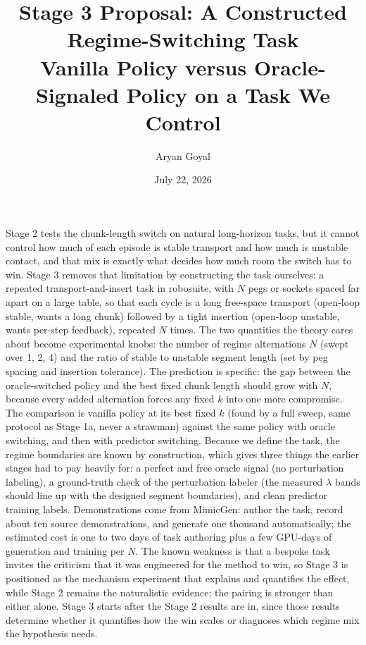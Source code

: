 \documentclass[11pt]{article}
\title{Stage 3 Proposal: A Constructed Regime-Switching Task\\
\large Vanilla Policy versus Oracle-Signaled Policy on a Task We Control}
\author{Aryan Goyal}
\date{July 22, 2026}
\begin{document}
\maketitle

\noindent
Stage 2 tests the chunk-length switch on natural long-horizon tasks, but it
cannot control how much of each episode is stable transport and how much is
unstable contact, and that mix is exactly what decides how much room the
switch has to win. Stage 3 removes that limitation by constructing the task
ourselves: a repeated transport-and-insert task in robosuite, with $N$ pegs
or sockets spaced far apart on a large table, so that each cycle is a long
free-space transport (open-loop stable, wants a long chunk) followed by a
tight insertion (open-loop unstable, wants per-step feedback), repeated $N$
times. The two quantities the theory cares about become experimental knobs:
the number of regime alternations $N$ (swept over 1, 2, 4) and the ratio of
stable to unstable segment length (set by peg spacing and insertion
tolerance). The prediction is specific: the gap between the oracle-switched
policy and the best fixed chunk length should grow with $N$, because every
added alternation forces any fixed $k$ into one more compromise. The
comparison is vanilla policy at its best fixed $k$ (found by a full sweep,
same protocol as Stage 1a, never a strawman) against the same policy with
oracle switching, and then with predictor switching. Because we define the
task, the regime boundaries are known by construction, which gives three
things the earlier stages had to pay heavily for: a perfect and free oracle
signal (no perturbation labeling), a ground-truth check of the perturbation
labeler (the measured $\lambda$ bands should line up with the designed
segment boundaries), and clean predictor training labels. Demonstrations
come from MimicGen: author the task, record about ten source demonstrations,
and generate one thousand automatically; the estimated cost is one to two
days of task authoring plus a few GPU-days of generation and training per
$N$. The known weakness is that a bespoke task invites the criticism that it
was engineered for the method to win, so Stage 3 is positioned as the
mechanism experiment that explains and quantifies the effect, while Stage 2
remains the naturalistic evidence; the pairing is stronger than either
alone. Stage 3 starts after the Stage 2 results are in, since those results
determine whether it quantifies how the win scales or diagnoses which
regime mix the hypothesis needs.
\end{document}
